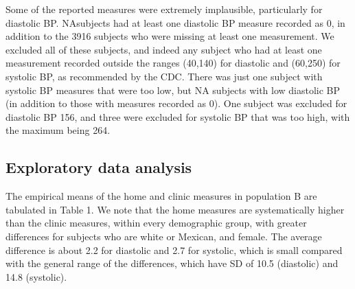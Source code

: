 \documentclass[
]{article}
\begin{document}
Some of the reported measures were extremely implausible, particularly for diastolic BP. NAsubjects had at least one diastolic BP measure recorded as 0, in addition to the 3916 subjects who were missing at least one measurement. We excluded all of these subjects, and indeed any subject who had at least one measurement recorded outside the ranges (40,140) for diastolic and (60,250) for systolic BP, as recommended by the CDC.
There was just one subject with systolic BP measures that were too low, but NA subjects with low diastolic BP (in addition to those with measures recorded as 0).
One subject was excluded for diastolic BP 156, and three were excluded for systolic BP that was too high, with the maximum being 264.

\hypertarget{exploratory-data-analysis}{%
\subsection{Exploratory data analysis}\label{exploratory-data-analysis}}

The empirical means of the home and clinic measures in population B are tabulated in Table 1. We note that the home measures are systematically higher than the clinic measures, within every demographic group, with greater differences for subjects who are white or Mexican, and female.
The average difference is about 2.2 for diastolic and 2.7 for systolic, which is small compared with the general range of the differences, which have SD of
10.5 (diastolic) and 14.8 (systolic).
\end{document}
